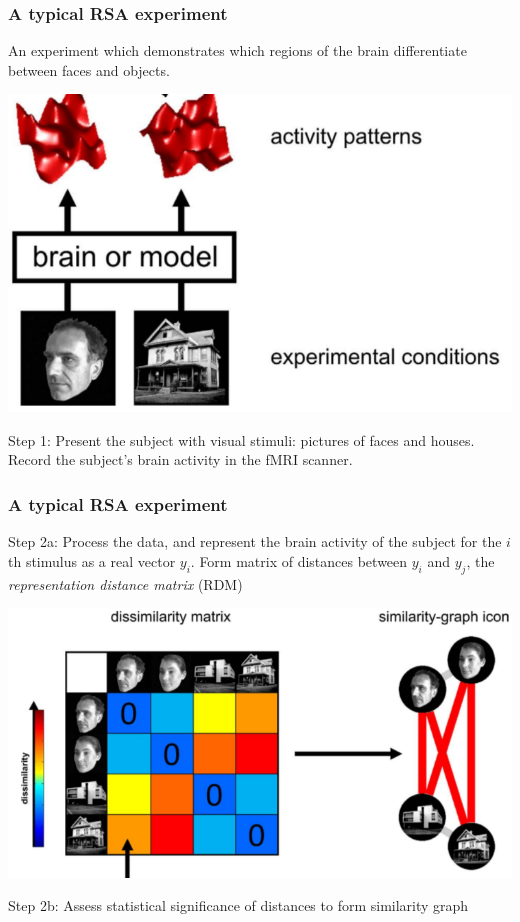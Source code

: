 \documentclass{beamer}
\begin{document}
\begin{frame}
\frametitle{A typical RSA experiment}
An experiment which demonstrates which regions of the brain differentiate between faces and objects.
\begin{center}
\includegraphics[scale = 0.3]{k08_step1.png}
\end{center}
Step 1: Present the subject with visual stimuli: pictures of faces and houses.
Record the subject's brain activity in the fMRI scanner.
\end{frame}

\begin{frame}
\frametitle{A typical RSA experiment}
Step 2a: Process the data, and represent the brain activity of the subject for the $i$th stimulus as a real vector $y_i$.
Form matrix of distances between $y_i$ and $y_j$, the \emph{representation distance matrix} (RDM)
\begin{center}
\includegraphics[scale = 0.3]{k08_step2.png}
\end{center}
Step 2b: Assess statistical significance of distances to form similarity graph
\end{frame}
\end{document}
